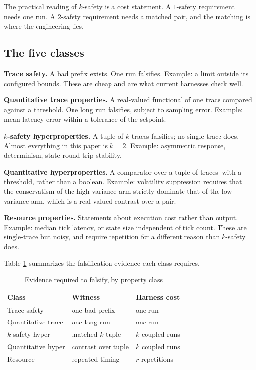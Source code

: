 \documentclass[sigconf,review,anonymous]{acmart}
\begin{document}
	The practical reading of $k$-safety is a cost statement. A $1$-safety
	requirement needs one run. A $2$-safety requirement needs a matched pair,
	and the matching is where the engineering lies.
	
	\subsection{The five classes}
	
	\textbf{Trace safety.} A bad prefix exists. One run falsifies. Example: a
	limit outside its configured bounds. These are cheap and are what current
	harnesses check well.
	
	\textbf{Quantitative trace properties.} A real-valued functional of one
	trace compared against a threshold. One long run falsifies, subject to
	sampling error. Example: mean latency error within a tolerance of the
	setpoint.
	
	\textbf{$k$-safety hyperproperties.} A tuple of $k$ traces falsifies; no
	single trace does. Almost everything in this paper is $k=2$. Example:
	asymmetric response, determinism, state round-trip stability.
	
	\textbf{Quantitative hyperproperties.} A comparator over a tuple of traces,
	with a threshold, rather than a boolean. Example: volatility suppression
	requires that the conservatism of the high-variance arm strictly dominate
	that of the low-variance arm, which is a real-valued contrast over a pair.
	
	\textbf{Resource properties.} Statements about execution cost rather than
	output. Example: median tick latency, or state size independent of tick
	count. These are single-trace but noisy,
	and require repetition for a different reason than $k$-safety does.
	
	Table \ref{tab:classes} summarizes the falsification evidence each class
	requires.
	
	\begin{table}[t]
		\caption{Evidence required to falsify, by property class}
		\label{tab:classes}
		\centering
		\small
		\begin{tabular}{@{}lll@{}}
			\toprule
			Class & Witness & Harness cost \\
			\midrule
			Trace safety & one bad prefix & one run \\
			Quantitative trace & one long run & one run \\
			$k$-safety hyper & matched $k$-tuple & $k$ coupled runs \\
			Quantitative hyper & contrast over tuple & $k$ coupled runs \\
			Resource & repeated timing & $r$ repetitions \\
			\bottomrule
		\end{tabular}
	\end{table}
	
\end{document}
